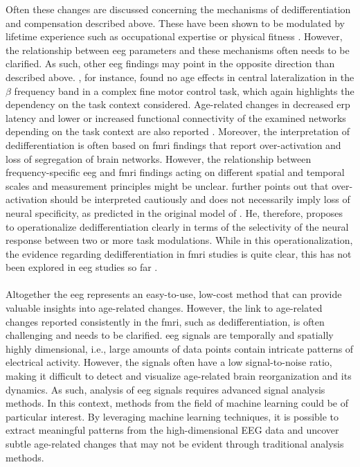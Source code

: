 Often these changes are discussed concerning the mechanisms of dedifferentiation and compensation described above. These have been shown to be modulated by lifetime experience such as occupational expertise \cite{vieluf2018age} or physical fitness \cite{Douw2014}. However, the relationship between \gls{eeg} parameters and these mechanisms often needs to be clarified. As such, other \gls{eeg} findings may point in the opposite direction than described above. \citeauthor{HUBNER2018104} \cite{HUBNER2018104}, for instance, found no age effects in central lateralization in the $\beta$ frequency band in a complex fine motor control task, which again highlights the dependency on the task context considered. Age-related changes in decreased \gls{erp} latency and lower or increased functional connectivity of the examined networks depending on the task context are also reported \cite{Courtney2021}. Moreover, the interpretation of dedifferentiation is often based on \gls{fmri} findings that report over-activation and loss of segregation of brain networks. However, the relationship between frequency-specific \gls{eeg} and \gls{fmri} findings acting on different spatial and temporal scales and measurement principles might be unclear. \citeauthor{Koen2019} \cite{Koen2019} further points out that over-activation should be interpreted cautiously and does not necessarily imply loss of neural specificity, as predicted in the original model of \citeauthor{Li2000} \cite{Li2000}. He, therefore, proposes to operationalize dedifferentiation clearly in terms of the selectivity of the neural response between two or more task modulations. While in this operationalization, the evidence regarding dedifferentiation in \gls{fmri} studies is quite clear, this has not been explored in \gls{eeg} studies so far \cite{Koen2019}.\\
\\
Altogether the \gls{eeg} represents an easy-to-use, low-cost method that can provide valuable insights into age-related changes. However, the link to age-related changes reported consistently in the \gls{fmri}, such as dedifferentiation, is often challenging and needs to be clarified. \Gls{eeg} signals are temporally and spatially highly dimensional, i.e., large amounts of data points contain intricate patterns of electrical activity. However, the signals often have a low signal-to-noise ratio, making it difficult to detect and visualize age-related brain reorganization and its dynamics. As such, analysis of \gls{eeg} signals requires advanced signal analysis methods. In this context, methods from the field of machine learning could be of particular interest. By leveraging machine learning techniques, it is possible to extract meaningful patterns from the high-dimensional EEG data and uncover subtle age-related changes that may not be evident through traditional analysis methods.
